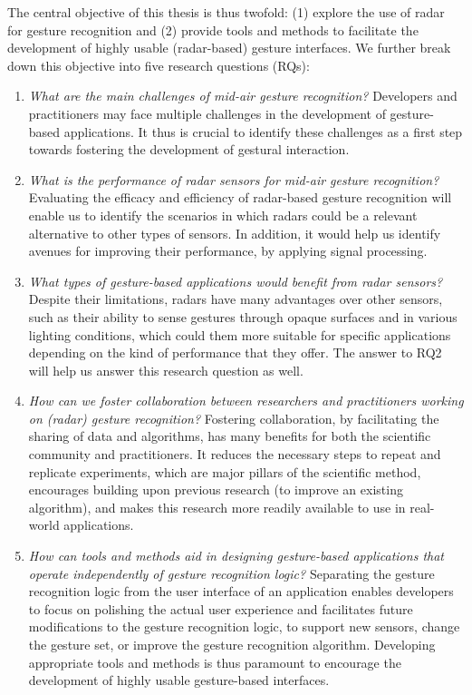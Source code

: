 The central objective of this thesis is thus twofold: (1) {explore the use of radar for gesture recognition} and (2) {provide tools and methods to facilitate the development of highly usable (radar-based) gesture interfaces}. 
%
We further break down this objective into five research questions (RQs):
\begin{enumerate}[label=\textit{RQ\arabic*}]
    \item \textit{What are the main challenges of mid-air gesture recognition?} 
    Developers and practitioners may face multiple challenges in the development of gesture-based applications. It thus is crucial to identify these challenges as a first step towards fostering the development of gestural interaction.
    \item \textit{What is the performance of radar sensors for mid-air gesture recognition?} 
    Evaluating the efficacy and efficiency of radar-based gesture recognition will enable us to identify the scenarios in which radars could be a relevant alternative to other types of sensors. In addition, it would help us identify avenues for improving their performance, \eg by applying signal processing.
    \item \textit{What types of gesture-based applications would benefit from radar sensors?} 
    Despite their limitations, radars have many advantages over other sensors, such as their ability to sense gestures through opaque surfaces and in various lighting conditions, which could them more suitable for specific applications depending on the kind of performance that they offer. The answer to RQ2 will help us answer this research question as well.
    \item \textit{How can we foster collaboration between researchers and practitioners working on (radar) gesture recognition?}
    Fostering collaboration, \eg by facilitating the sharing of data and algorithms, has many benefits for both the scientific community and practitioners. It reduces the necessary steps to repeat and replicate experiments, which are major pillars of the scientific method, encourages building upon previous research (\eg to improve an existing algorithm), and makes this research more readily available to use in real-world applications.
    \item \textit{How can tools and methods aid in designing gesture-based applications that operate independently of gesture recognition logic?} 
    Separating the gesture recognition logic from the user interface of an application enables developers to focus on polishing the actual user experience and facilitates future modifications to the gesture recognition logic, \eg to support new sensors, change the gesture set, or improve the gesture recognition algorithm. Developing appropriate tools and methods is thus paramount to encourage the development of highly usable gesture-based interfaces. 
\end{enumerate}


